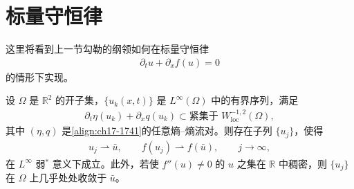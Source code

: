 \documentclass[../../main.tex]{subfiles}
\begin{document}
\section{标量守恒律}\label{section:ch17-标量守恒律}

这里将看到上一节勾勒的纲领如何在标量守恒律
\begin{align}
\partial_t u+\partial_x f(u)=0
\label{align:ch17-1741}
\end{align}
的情形下实现。

\begin{theorem}[标量情形的补偿紧致性]\label{theorem:ch17-标量补偿紧致}
设 $\Omega$ 是 $\mathbb{R}^2$ 的开子集，$\{u_k(x,t)\}$ 是 $L^\infty(\Omega)$ 中的有界序列，满足
\begin{align}
\partial_t\eta(u_k)+\partial_x q(u_k)\subset\text{紧集于 }W^{-1,2}_{\mathrm{loc}}(\Omega),
\label{align:ch17-1742}
\end{align}
其中 $(\eta,q)$ 是\eqref{align:ch17-1741}的任意熵--熵流对。则存在子列 $\{u_j\}$，使得
\begin{align}
u_j\rightharpoonup\bar u,\qquad f(u_j)\rightharpoonup f(\bar u),\qquad j\to\infty,
\label{align:ch17-1743}
\end{align}
在 $L^\infty$ 弱$^*$ 意义下成立。此外，若使 $f''(u)\neq0$ 的 $u$ 之集在 $\mathbb{R}$ 中稠密，则 $\{u_j\}$ 在 $\Omega$ 上几乎处处收敛于 $\bar u$。
\end{theorem}
\end{document}
